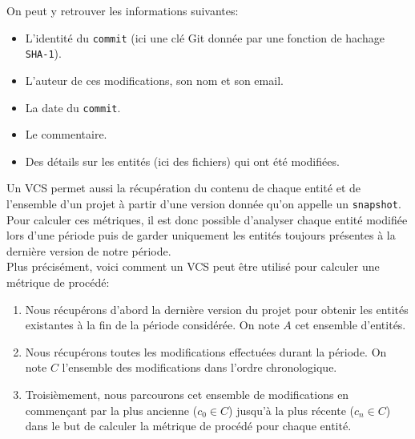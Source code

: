 \newpage
On peut y retrouver les informations suivantes: 
\begin{itemize}
\item L'identité du \texttt{commit} (ici une clé Git donnée par une fonction de hachage \texttt{SHA-1}).
\item L'auteur de ces modifications, son nom et son email.
\item La date du \texttt{commit}.
\item Le commentaire.
\item Des détails sur les entités (ici des fichiers) qui ont été modifiées.\\
\end{itemize}

Un VCS permet aussi la récupération du contenu de chaque entité et de l'ensemble d'un projet à partir d'une version donnée qu'on appelle un \texttt{snapshot}. Pour calculer ces métriques, il est donc possible d'analyser chaque entité modifiée lors d'une période puis de garder uniquement les entités toujours présentes à la dernière version de notre période.\\

Plus précisément, voici comment un VCS peut être utilisé pour calculer une métrique de procédé: 
\begin{enumerate}
\item Nous récupérons d'abord la dernière version du projet pour obtenir les entités existantes à la fin de la période considérée. On note $A$ cet ensemble d'entités.
\item Nous récupérons toutes les modifications effectuées durant la période. On note $C$ l'ensemble des modifications dans l'ordre chronologique.
\item Troisièmement, nous parcourons cet ensemble de modifications en commençant par la plus ancienne ($c_0 \in C$) jusqu'à la plus récente ($c_n \in C$) dans le but de calculer la métrique de procédé pour chaque entité.
\end{enumerate}

